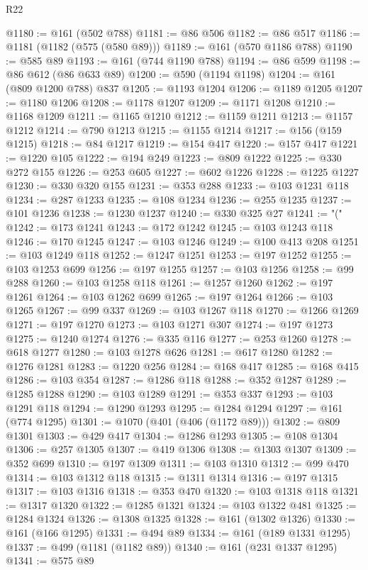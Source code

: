 \begin{lexlean}{R22}
\begin{coremodule}
@1180 := @161 (@502 @788)
@1181 := @86 @506
@1182 := @86 @517
@1186 := @1181 (@1182 (@575 (@580 @89)))
@1189 := @161 (@570 @1186 @788)
@1190 := @585 @89
@1193 := @161 (@744 @1190 @788)
@1194 := @86 @599
@1198 := @86 @612 (@86 @633 @89)
@1200 := @590 (@1194 @1198)
@1204 := @161 (@809 @1200 @788) @837
@1205 := @1193 @1204
@1206 := @1189 @1205
@1207 := @1180 @1206
@1208 := @1178 @1207
@1209 := @1171 @1208
@1210 := @1168 @1209
@1211 := @1165 @1210
@1212 := @1159 @1211
@1213 := @1157 @1212
@1214 := @790 @1213
@1215 := @1155 @1214
@1217 := @156 (@159 @1215)
@1218 := @84 @1217
@1219 := @154 @417
@1220 := @157 @417
@1221 := @1220 @105
@1222 := @194 @249
@1223 := @809 @1222
@1225 := @330 @272 @155
@1226 := @253 @605
@1227 := @602 @1226
@1228 := @1225 @1227
@1230 := @330 @320 @155
@1231 := @353 @288
@1233 := @103 @1231 @118
@1234 := @287 @1233
@1235 := @108 @1234
@1236 := @255 @1235
@1237 := @101 @1236
@1238 := @1230 @1237
@1240 := @330 @325 @27
@1241 := "("
@1242 := @173 @1241
@1243 := @172 @1242
@1245 := @103 @1243 @118
@1246 := @170 @1245
@1247 := @103 @1246
@1249 := @100 @413 @208
@1251 := @103 @1249 @118
@1252 := @1247 @1251
@1253 := @197 @1252
@1255 := @103 @1253 @699
@1256 := @197 @1255
@1257 := @103 @1256
@1258 := @99 @288
@1260 := @103 @1258 @118
@1261 := @1257 @1260
@1262 := @197 @1261
@1264 := @103 @1262 @699
@1265 := @197 @1264
@1266 := @103 @1265
@1267 := @99 @337
@1269 := @103 @1267 @118
@1270 := @1266 @1269
@1271 := @197 @1270
@1273 := @103 @1271 @307
@1274 := @197 @1273
@1275 := @1240 @1274
@1276 := @335 @116
@1277 := @253 @1260
@1278 := @618 @1277
@1280 := @103 @1278 @626
@1281 := @617 @1280
@1282 := @1276 @1281
@1283 := @1220 @256
@1284 := @168 @417
@1285 := @168 @415
@1286 := @103 @354
@1287 := @1286 @118
@1288 := @352 @1287
@1289 := @1285 @1288
@1290 := @103 @1289
@1291 := @353 @337
@1293 := @103 @1291 @118
@1294 := @1290 @1293
@1295 := @1284 @1294
@1297 := @161 (@774 @1295)
@1301 := @1070 (@401 (@406 (@1172 @89)))
@1302 := @809 @1301
@1303 := @429 @417
@1304 := @1286 @1293
@1305 := @108 @1304
@1306 := @257 @1305
@1307 := @419 @1306
@1308 := @1303 @1307
@1309 := @352 @699
@1310 := @197 @1309
@1311 := @103 @1310
@1312 := @99 @470
@1314 := @103 @1312 @118
@1315 := @1311 @1314
@1316 := @197 @1315
@1317 := @103 @1316
@1318 := @353 @470
@1320 := @103 @1318 @118
@1321 := @1317 @1320
@1322 := @1285 @1321
@1324 := @103 @1322 @481
@1325 := @1284 @1324
@1326 := @1308 @1325
@1328 := @161 (@1302 @1326)
@1330 := @161 (@166 @1295)
@1331 := @494 @89
@1334 := @161 (@189 @1331 @1295)
@1337 := @499 (@1181 (@1182 @89))
@1340 := @161 (@231 @1337 @1295)
@1341 := @575 @89

\end{coremodule}
\end{lexlean}

